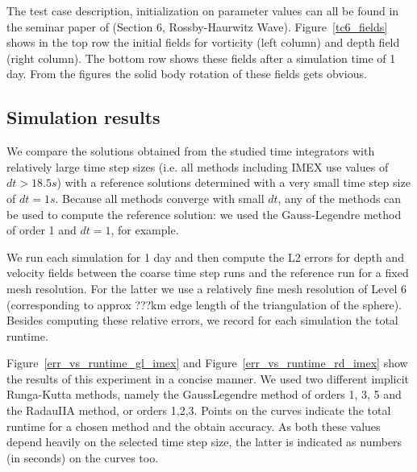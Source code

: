 \documentclass[a4paper, 12pt]{article}
\newcommand{\checkit}[1]{{\color{red}#1}}
\begin{document}
The test case description, initialization on parameter values can all be found in the seminar paper of \cite{WILLIAMSON1992211} (Section 6, Rossby-Haurwitz Wave). Figure~\ref{tc6_fields} shows in the top row the initial fields for vorticity (left column) and depth field (right column). The bottom row shows these fields after a simulation time of 1 day. From the figures the solid body rotation of these fields gets obvious.





\subsection{Simulation results}

We compare the solutions obtained from the studied time integrators with relatively
large time step sizes (i.e. all methods including IMEX use values of $dt >18.5s$) with a reference solutions determined with a very small time step size of $dt=1s$. Because all methods converge with small
$dt$, any of the methods can be used to compute the reference solution: we used the Gauss-Legendre method of order 1 and $dt=1$, for example.

We run each simulation for 1 day and then compute the L2 errors for depth and velocity fields between the coarse time step runs and the reference run for a fixed mesh resolution. For the latter we use a relatively fine mesh resolution of Level 6 (corresponding to approx ???km edge length of the triangulation of the sphere). Besides computing these relative errors, we record for each simulation the total runtime.

Figure~\ref{err_vs_runtime_gl_imex} and Figure~\ref{err_vs_runtime_rd_imex} show the results of this experiment in a concise manner. We used two different implicit Runga-Kutta methods, namely the GaussLegendre method of orders \checkit{1, 3, 5 and the RadauIIA method, or orders 1,2,3}. Points on the curves indicate the total runtime for a chosen method and the obtain accuracy. As both these values depend heavily on the selected time step size, the latter is indicated as numbers (in seconds) on the curves too.
\end{document}
